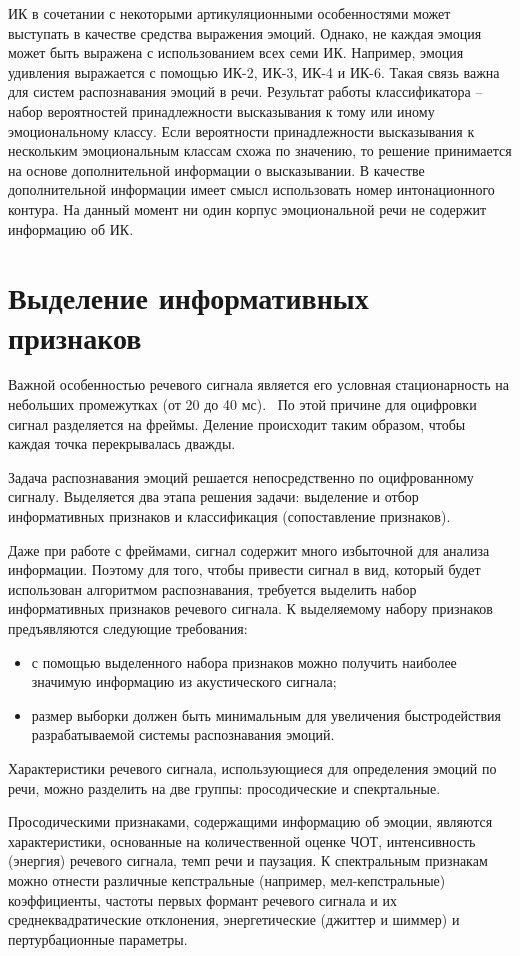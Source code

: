 ИК в сочетании с некоторыми артикуляционными особенностями может выступать в качестве средства выражения эмоций. Однако, не каждая эмоция может быть выражена с использованием всех семи ИК. Например, эмоция удивления выражается с помощью ИК-2, ИК-3, ИК-4 и ИК-6. \cite{conn} Такая связь важна для систем распознавания эмоций в речи. Результат работы классификатора -- набор вероятностей принадлежности высказывания к тому или иному эмоциональному классу. Если вероятности принадлежности высказывания к нескольким эмоциональным классам схожа по значению, то решение принимается на основе дополнительной информации о высказывании. В качестве дополнительной информации имеет смысл использовать номер интонационного контура. На данный момент ни один корпус эмоциональной речи не содержит информацию об ИК.

\section{Выделение информативных признаков}
Важной особенностью речевого сигнала является его условная стационарность на небольших промежутках (от 20 до 40 мс).~\cite{frames} По этой причине для оцифровки сигнал разделяется на фреймы. Деление происходит таким образом, чтобы каждая точка перекрывалась дважды.~\cite{mfcc-steps}

Задача распознавания эмоций решается непосредственно по оцифрованному сигналу. Выделяется два этапа решения задачи: выделение и отбор информативных признаков и классификация (сопоставление признаков).


Даже при работе с фреймами, сигнал содержит много избыточной для анализа информации. Поэтому для того, чтобы привести сигнал в вид, который будет использован алгоритмом распознавания, требуется выделить набор информативных признаков речевого сигнала. К выделяемому набору признаков предъявляются следующие требования: \cite{features-must}
\begin{itemize}
	\item с помощью выделенного набора признаков можно получить наиболее значимую информацию из акустического сигнала;
	\item размер выборки должен быть минимальным для увеличения быстродействия разрабатываемой системы распознавания эмоций.
\end{itemize}
Характеристики речевого сигнала, использующиеся для определения эмоций по речи, можно разделить на две группы: просодические и спекртальные. 

Просодическими признаками, содержащими информацию об эмоции, являются характеристики, основанные на количественной оценке ЧОТ, интенсивность (энергия) речевого сигнала, темп речи и паузация. К спектральным признакам можно отнести различные кепстральные (например, мел-кепстральные) коэффициенты, частоты первых формант речевого сигнала и их среднеквадратические отклонения, энергетические (джиттер и шиммер) и пертурбационные параметры.

